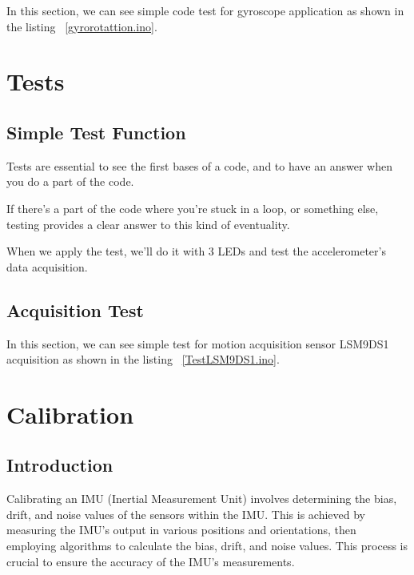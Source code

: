 In this section, we can see simple code test for gyroscope application as shown in the listing ~\ref{gyrorotattion.ino}.

{
	
	\label{gyrorotattion.ino}
}

\section{Tests}
\subsection{Simple Test Function}
Tests are essential to see the first bases of a code, and to have an answer when you do a part of the code. 

If there's a part of the code where you're stuck in a loop, or something else, testing provides a clear answer to this kind of eventuality. 

When we apply the test, we'll do it with 3 LEDs and test the accelerometer's data acquisition. 

\subsection{Acquisition Test}

In this section, we can see simple test for motion acquisition sensor LSM9DS1 acquisition as shown in the listing ~\ref{TestLSM9DS1.ino}.

{
	
	\label{TestLSM9DS1.ino}
	
}



\section{Calibration}
\subsection{Introduction}

Calibrating an IMU (Inertial Measurement Unit) involves determining the bias, drift, and noise values of the sensors within the IMU. This is achieved by measuring the IMU's output in various positions and orientations, then employing algorithms to calculate the bias, drift, and noise values. This process is crucial to ensure the accuracy of the IMU's measurements. \cite{sugunsegu_imu_calibration:2024}


